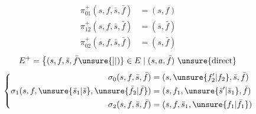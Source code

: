 \[\begin{aligned}
\pi_{01}^{+}(s,f,\bar s,\bar f)&=(s,f)\\
\pi_{12}^{+}(s,f,\bar s,\bar f)&=(\bar s,\bar f)\\
\pi_{02}^{+}(s,f,\bar s,\bar f)&=(s,\bar f)
\end{aligned}\]
\[E^+=\left\{(s,f,\bar s,\bar f\unsure{]|)}\in E\mid(s,a,\bar f)\ \text{\unsure{direct}}\right.\]
\[\left\{\begin{aligned}
\sigma_0(s,f,\bar s,\bar f)&=(s,\unsure{f_2'|f_2},\bar s,\bar f)\\
\sigma_1(s,f,\unsure{\bar s_1|\bar s},\unsure{\bar f_2|\bar f})&=(s,f_1,\unsure{\bar s'|\bar s_1},\bar f)\\
\sigma_2(s,f,\bar s,\bar f)&=(s,f,\bar s_1,\unsure{f_1|\bar f_1})
\end{aligned}\right.\]

